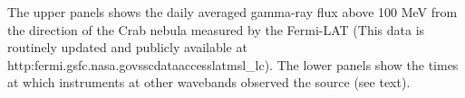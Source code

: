 The upper panels shows the daily averaged gamma-ray flux above 100 MeV from the direction of the Crab nebula measured by the Fermi-LAT (This data is routinely updated and publicly available at http:\/\/fermi.gsfc.nasa.gov\/ssc\/data\/access\/lat\/msl\_lc\/). The lower panels show the times at which instruments at other wavebands observed the source (see text).\label{fig:lc}